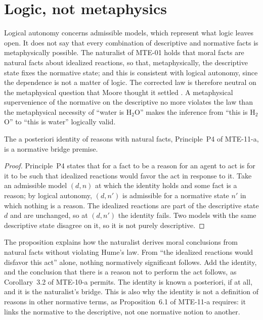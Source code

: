 \documentclass{situationist-preprint}
\begin{document}
\section{Logic, not metaphysics}

Logical autonomy concerns admissible models, which represent what logic leaves open. It does not say that every combination of descriptive and normative facts is metaphysically possible. The naturalist of MTE-01 holds that moral facts are natural facts about idealized reactions, so that, metaphysically, the descriptive state fixes the normative state; and this is consistent with logical autonomy, since the dependence is not a matter of logic. The corrected law is therefore neutral on the metaphysical question that Moore thought it settled \citep{Moore1903}. A metaphysical supervenience of the normative on the descriptive no more violates the law than the metaphysical necessity of \enquote{water is H$_2$O} makes the inference from \enquote{this is H$_2$O} to \enquote{this is water} logically valid.

\begin{proposition}\label{p:identity}
The a posteriori identity of reasons with natural facts, Principle~P4 of MTE-11-a, is a normative bridge premise.
\end{proposition}

\begin{proof}
Principle~P4 states that for a fact to be a reason for an agent to act is for it to be such that idealized reactions would favor the act in response to it. Take an admissible model $(d,n)$ at which the identity holds and some fact is a reason; by logical autonomy, $(d,n')$ is admissible for a normative state $n'$ in which nothing is a reason. The idealized reactions are part of the descriptive state $d$ and are unchanged, so at $(d,n')$ the identity fails. Two models with the same descriptive state disagree on it, so it is not purely descriptive.
\end{proof}

The proposition explains how the naturalist derives moral conclusions from natural facts without violating Hume's law. From \enquote{the idealized reactions would disfavor this act} alone, nothing normatively significant follows. Add the identity, and the conclusion that there is a reason not to perform the act follows, as Corollary~3.2 of MTE-10-a permits. The identity is known a posteriori, if at all, and it is the naturalist's bridge. This is also why the identity is not a definition of reasons in other normative terms, as Proposition~6.1 of MTE-11-a requires: it links the normative to the descriptive, not one normative notion to another.
\end{document}
